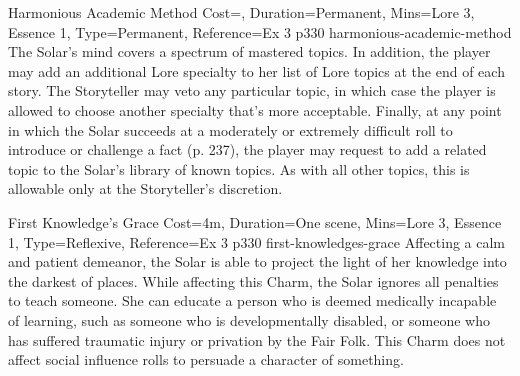 \begin{Charm}{Harmonious Academic Method}{
    Cost=\NoCost,
    Duration=Permanent,
    Mins={Lore 3, Essence 1},
    Type=Permanent,
    Reference=Ex 3 p330
}{harmonious-academic-method}
    The Solar’s mind covers a spectrum of mastered topics.  In addition, the player may add an
    additional Lore specialty to her list of Lore topics at the end of each
    story. The Storyteller may veto any particular topic, in which case the
    player is allowed to choose another specialty that’s more acceptable.
    Finally, at any point in which the Solar succeeds at a moderately or
    extremely difficult roll to introduce or challenge a fact (p. 237), the
    player may request to add a related topic to the Solar’s library of known
    topics. As with all other topics, this is allowable only at the
    Storyteller’s discretion.
\end{Charm}

\begin{Charm}{First Knowledge's Grace}{
    Cost=4m,
    Duration=One scene,
    Mins={Lore 3, Essence 1},
    Type=Reflexive,
    Reference=Ex 3 p330
}{first-knowledges-grace}
    Affecting a calm and patient demeanor, the Solar is able to project the
    light of her knowledge into the darkest of places. While affecting this
    Charm, the Solar ignores all penalties to teach someone. She can educate a
    person who is deemed medically incapable of learning, such as someone who
    is developmentally disabled, or someone who has suffered traumatic injury
    or privation by the Fair Folk. This Charm does not affect social influence
    rolls to persuade a character of something.
\end{Charm}


